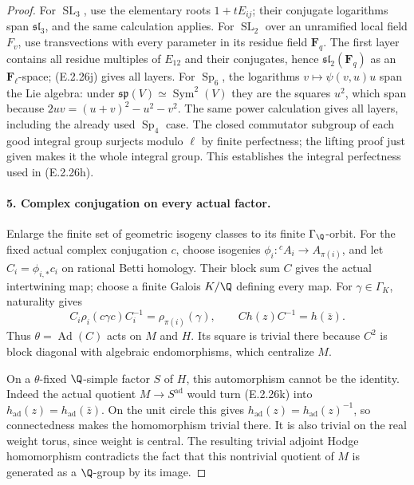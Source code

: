 \begin{proof}
For \(\operatorname{SL}_3\), use the elementary roots
\(1+tE_{ij}\); their conjugate logarithms span
\(\mathfrak{sl}_3\), and the same calculation applies.
For \(\operatorname{SL}_2\) over an unramified local
field \(F_v\), use transvections with every parameter in
its residue field \(\mathbf F_q\). The first layer
contains all residue multiples of \(E_{12}\) and their
conjugates, hence \(\mathfrak{sl}_2(\mathbf F_q)\) as
an \(\mathbf F_\ell\)-space; (E.2.26j) gives all layers.
For \(\operatorname{Sp}_6\), the logarithms
\(v\mapsto\psi(v,u)u\) span the Lie algebra: under
\(\mathfrak{sp}(V)\simeq\operatorname{Sym}^2(V)\)
they are the squares \(u^2\), which span because
\(2uv=(u+v)^2-u^2-v^2\). The same power calculation
gives all layers, including the already used
\(\operatorname{Sp}_4\) case.
The closed commutator subgroup of each good integral group
surjects modulo \(\ell\) by finite perfectness; the lifting
proof just given makes it the whole integral group. This
establishes the integral perfectness used in (E.2.26h).

\paragraph{5. Complex conjugation on every actual factor.}
Enlarge the finite set of geometric isogeny classes to its
finite \(\Gamma_\Q\)-orbit. For the fixed actual complex
conjugation \(c\), choose isogenies
\(\phi_i:{}^c A_i\to A_{\pi(i)}\), and let
\(C_i=\phi_{i,*}c_i\) on rational Betti homology.
Their block sum \(C\) gives the actual intertwining map;
choose a finite Galois \(K/\Q\) defining every map.
For \(\gamma\in\Gamma_K\), naturality gives
\[
 C_i\rho_i(c\gamma c)C_i^{-1}
         =\rho_{\pi(i)}(\gamma),\qquad
 C h(z)C^{-1}=h(\bar z).
 \tag{E.2.26k}
\]
Thus \(\theta=\operatorname{Ad}(C)\) acts on \(M\)
and \(H\). Its square is trivial there because \(C^2\)
is block diagonal with algebraic endomorphisms, which
centralize \(M\).

On a \(\theta\)-fixed \(\Q\)-simple factor \(S\)
of \(H\), this automorphism cannot be the identity.
Indeed the actual quotient \(M\to S^{\mathrm{ad}}\)
would turn (E.2.26k) into
\(h_{\mathrm{ad}}(z)=h_{\mathrm{ad}}(\bar z)\).
On the unit circle this gives
\(h_{\mathrm{ad}}(z)=h_{\mathrm{ad}}(z)^{-1}\), so
connectedness makes the homomorphism trivial there.
It is also trivial on the real weight torus, since
weight is central. The resulting trivial adjoint
Hodge homomorphism contradicts the fact that this
nontrivial quotient of \(M\) is generated as a
\(\Q\)-group by its image.


\end{proof}
